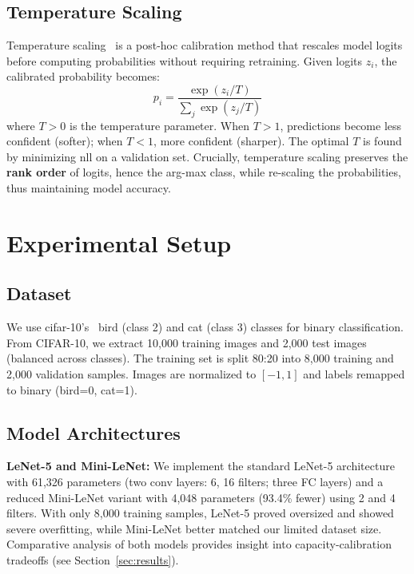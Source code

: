 \documentclass[10pt,twocolumn]{article}
\begin{document}
\subsection{Temperature Scaling}

Temperature scaling~\cite{platt1999probabilistic,pmlr-v70-guo17a} is a post-hoc calibration method that rescales model logits before computing probabilities without requiring retraining. Given logits $z_i$, the calibrated probability becomes:
\begin{equation}
p_i = \frac{\exp(z_i/T)}{\sum_j \exp(z_j/T)}
\end{equation}
where $T > 0$ is the temperature parameter. When $T>1$, predictions become less confident (softer); when $T<1$, more confident (sharper). The optimal $T$ is found by minimizing \gls{nll} on a validation set. Crucially, temperature scaling preserves the \textbf{rank order} of logits, hence the arg-max class, while re-scaling the probabilities, thus maintaining model accuracy.

\section{Experimental Setup}
\label{sec:setup}

\subsection{Dataset}
We use \gls{cifar}-10's~\cite{krizhevsky2009learning} bird (class 2) and cat (class 3) classes for binary classification. From CIFAR-10, we extract 10,000 training images and 2,000 test images (balanced across classes). The training set is split 80:20 into 8,000 training and 2,000 validation samples. Images are normalized to $[-1, 1]$ and labels remapped to binary (bird=0, cat=1).

\subsection{Model Architectures}

\textbf{LeNet-5 and Mini-LeNet:} We implement the standard LeNet-5 architecture~\cite{lecun1998gradient} with 61,326 parameters (two conv layers: 6, 16 filters; three FC layers) and a reduced Mini-LeNet variant with 4,048 parameters (93.4\% fewer) using 2 and 4 filters. With only 8,000 training samples, LeNet-5 proved oversized and showed severe overfitting, while Mini-LeNet better matched our limited dataset size. Comparative analysis of both models provides insight into capacity-calibration tradeoffs (see Section~\ref{sec:results}).
\end{document}
